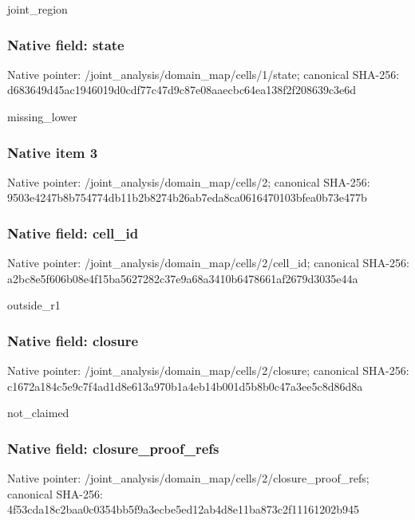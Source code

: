 \documentclass[10pt,a4paper]{article}
\begin{document}
\begingroup\raggedright\sloppy joint\_\allowbreak{}region\par\endgroup

\subsubsection{Native field: state}
Native pointer: /joint\_\allowbreak{}analysis/domain\_\allowbreak{}map/cells/1/state; canonical SHA-256: d683649d45ac1946019d0cdf77c47d9c87e08aaecbc64ea138f2f208639c3e6d

\begingroup\raggedright\sloppy missing\_\allowbreak{}lower\par\endgroup

\subsubsection{Native item 3}
Native pointer: /joint\_\allowbreak{}analysis/domain\_\allowbreak{}map/cells/2; canonical SHA-256: 9503e4247b8b754774db11b2b8274b26ab7eda8ca0616470103bfea0b73e477b

\subsubsection{Native field: cell\_\allowbreak{}id}
Native pointer: /joint\_\allowbreak{}analysis/domain\_\allowbreak{}map/cells/2/cell\_\allowbreak{}id; canonical SHA-256: a2bc8e5f606b08e4f15ba5627282c37e9a68a3410b6478661af2679d3035e44a

\begingroup\raggedright\sloppy outside\_\allowbreak{}r1\par\endgroup

\subsubsection{Native field: closure}
Native pointer: /joint\_\allowbreak{}analysis/domain\_\allowbreak{}map/cells/2/closure; canonical SHA-256: c1672a184c5e9c7f4ad1d8e613a970b1a4eb14b001d5b8b0c47a3ee5c8d86d8a

\begingroup\raggedright\sloppy not\_\allowbreak{}claimed\par\endgroup

\subsubsection{Native field: closure\_\allowbreak{}proof\_\allowbreak{}refs}
Native pointer: /joint\_\allowbreak{}analysis/domain\_\allowbreak{}map/cells/2/closure\_\allowbreak{}proof\_\allowbreak{}refs; canonical SHA-256: 4f53cda18c2baa0c0354bb5f9a3ecbe5ed12ab4d8e11ba873c2f11161202b945
\end{document}
